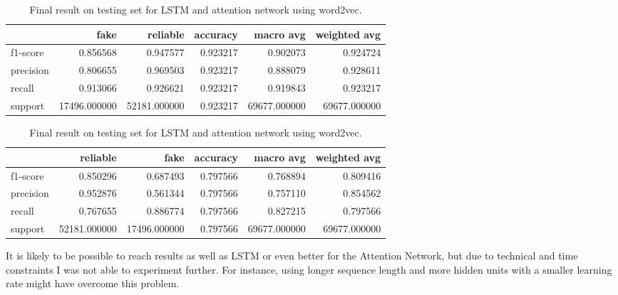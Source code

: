 \begin{table}
 \begin{subtable}{\textwidth}
  \begin{tabular}{lrrrrr}
  \toprule
  {} &          fake &      reliable &  accuracy &     macro avg &  weighted avg \\
  \midrule
  f1-score  &      0.856568 &      0.947577 &  0.923217 &      0.902073 &      0.924724 \\
  precision &      0.806655 &      0.969503 &  0.923217 &      0.888079 &      0.928611 \\
  recall    &      0.913066 &      0.926621 &  0.923217 &      0.919843 &      0.923217 \\
  support   &  17496.000000 &  52181.000000 &  0.923217 &  69677.000000 &  69677.000000 \\
  \bottomrule
  \end{tabular}
  \caption{LSTM + word2vec results on \textbf{Fake News Corpus}}
 \end{subtable}
 \begin{subtable}{\textwidth}
  \begin{tabular}{lrrrrr}
  \toprule
  {} &      reliable &          fake &  accuracy &     macro avg &  weighted avg \\
  \midrule
  f1-score  &      0.850296 &      0.687493 &  0.797566 &      0.768894 &      0.809416 \\
  precision &      0.952876 &      0.561344 &  0.797566 &      0.757110 &      0.854562 \\
  recall    &      0.767655 &      0.886774 &  0.797566 &      0.827215 &      0.797566 \\
  support   &  52181.000000 &  17496.000000 &  0.797566 &  69677.000000 &  69677.000000 \\
  \bottomrule
  \end{tabular}
  \caption{Attention Network + word2vec on \textbf{Fake News Corpus}}
 \end{subtable}
 \caption{Final result on testing set for LSTM and attention network using word2vec.}
 \label{table:chap4:results2}
\end{table}
It is likely to be possible to reach results as well as LSTM or even better for the Attention Network, but due to technical and time constraints I was not able to experiment further. For instance, using longer sequence length and more hidden units with a smaller learning rate might have overcome this problem. 

